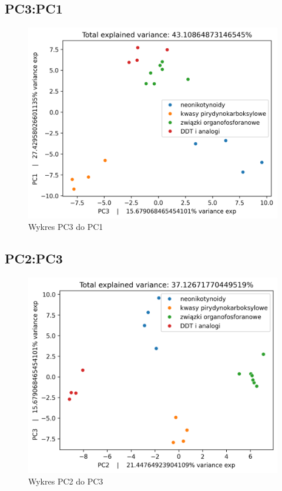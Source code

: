 \documentclass[12pt, a4paper]{article}
\begin{document}
    \subsection*{PC3:PC1}
        \begin{figure}[H]
            \centering
            \includegraphics{31.png}
            \caption{Wykres PC3 do PC1}
        \end{figure}
    
    \subsection*{PC2:PC3}
        \begin{figure}[H]
            \centering
            \includegraphics{23.png}
            \caption{Wykres PC2 do PC3}
        \end{figure}
\end{document}
